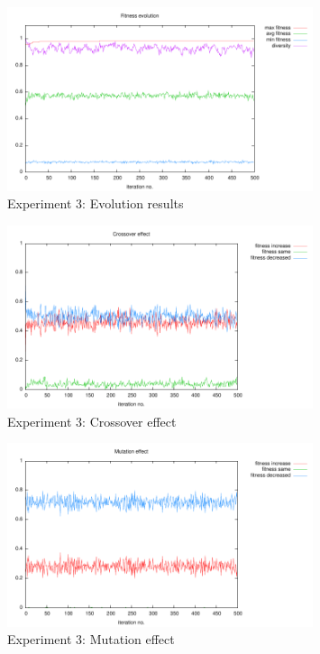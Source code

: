 \documentclass[12pt,a4paper]{article}
\begin{document}
\begin{figure}
\centering
\includegraphics[width=0.8\textwidth]{results/3/1.pdf}
\caption{Experiment 3: Evolution results}
\label{pic-e3-results}
\end{figure}

\begin{figure}
\centering
\includegraphics[width=0.8\textwidth]{results/3/1-cs.pdf}
\caption{Experiment 3: Crossover effect}
\label{pic-e3-cs}
\end{figure}

\begin{figure}
\centering
\includegraphics[width=0.8\textwidth]{results/3/1-ms.pdf}
\caption{Experiment 3: Mutation effect}
\label{pic-e3-ms}
\end{figure}
\end{document}
